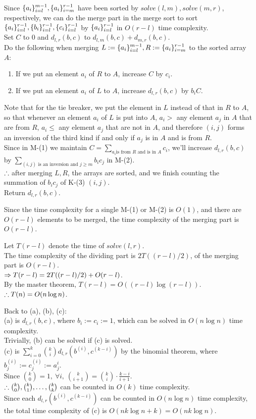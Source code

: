 \begin{pr}
Since $\{{a}_i\}_{i=l}^{m-1}, \{{a}_i\}_{i=m}^{r-1}$ have been sorted by $solve(l, m), solve(m, r)$, respectively, we can do the merge part in the merge sort to sort $\{{a}_i\}_{i=l}^{r-1}, \{{b}_i\}_{i=l}^{r-1}, \{{c}_i\}_{i=l}^{r-1}$ by $\{{a}_i\}_{i=l}^{r-1}$ in $O(r-l)$ time complexity.\\
Set $C$ to $0$ and $d_{l, r}(b, c)$ to $d_{l, m}(b, c)+d_{m, r}(b, c)$.\\
Do the following when merging $L:=\{{a}_i\}_{i=l}^{m-1}, R:=\{{a}_i\}_{i=m}^{r-1}$ to the sorted array $A$:
\begin{enumerate}[M-(1)]
\item If we put an element $a_i$ of $R$ to $A$, increase $C$ by $c_i$.
\item If we put an element $a_i$ of $L$ to $A$, increase $d_{l, r}(b, c)$ by $b_iC$.
\end{enumerate}
Note that for the tie breaker, we put the element in $L$ instead of that in $R$ to $A$, so that whenever an element $a_i$ of $L$ is put into $A$, $a_i>$ any element $a_j$ in $A$ that are from $R$, $a_i\leq$ any element $a_j$ that are not in $A$, and therefore $(i, j)$ forms an inversion of the third kind if and only if $a_j$ is in $A$ and is from $R$.\\
Since in M-(1) we maintain $C=\sum_{a_i\text{is from }R\text{ and is in }A}c_i$, we'll increase $d_{l, r}(b, c)$ by $\sum_{(i, j)\text{ is an inversion and }j\geq m}b_ic_j$ in M-(2).\\
$\therefore$ after merging $L, R$, the arrays are sorted, and we finish counting the summation of $b_ic_j$ of K-(3) $(i, j)$.\\
Return $d_{l, r}(b, c)$.

Since the time complexity for a single M-(1) or M-(2) is $O(1)$, and there are $O(r-l)$ elements to be merged, the time complexity of the merging part is $O(r-l)$.

Let $T(r-l)$ denote the time of $solve(l, r)$.\\
The time complexity of the dividing part is $2T((r-l)/2)$, of the merging part is $O(r-l)$.\\
$\Rightarrow T(r-l)=2T((r-l)/2)+O(r-l)$.\\
By the master theorem, $T(r-l)=O((r-l)\log(r-l))$.\\
$\therefore T(n)=O(n\log n)$.

Back to (a), (b), (c):\\
(a) is $d_{l, r}(b, c)$, where $b_i:=c_i:=1$, which can be solved in $O(n\log n)$ time complexity.\\
Trivially, (b) can be solved if (c) is solved.\\
(c) is $\sum_{i=0}^k\binom kid_{l, r}(b^{(i)}, c^{(k-i)})$ by the binomial theorem, where $b_j^{(i)}:=c_j^{(i)}:=a_j^i$.\\
Since $\binom k0=1,\ \forall i,\ \binom k{i+1}=\binom ki\cdot\frac{k-i}{i+1}$.\\
$\therefore\binom k0, \binom k1, \dots, \binom kk$ can be counted in $O(k)$ time complexity.\\
Since each $d_{l, r}(b^{(i)}, c^{(k-i)})$ can be counted in $O(n\log n)$ time complexity, the total time complexity of (c) is $O(nk\log n+k)=O(nk\log n)$.
\end{pr}
